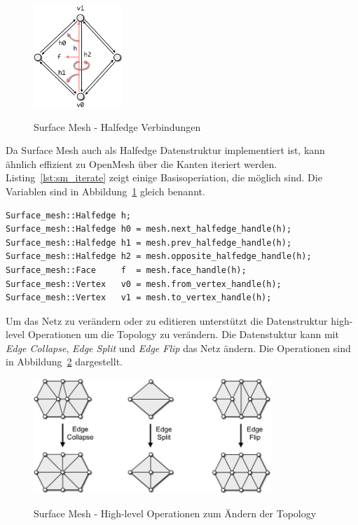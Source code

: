 \begin{figure}[h]
  \caption{Surface Mesh - Halfedge Verbindungen}
  \centering
  \includegraphics[width=0.3\textwidth]{content/media/sm_connectivity-queries}
  \label{fig:sm_halfedge}
\end{figure}

Da Surface Mesh auch als Halfedge Datenstruktur implementiert ist, kann ähnlich effizient zu OpenMesh über die Kanten iteriert werden.
Listing~\ref{lst:sm_iterate} zeigt einige Basisoperiation, die möglich sind.
Die Variablen sind in Abbildung~\ref{fig:sm_halfedge} gleich benannt. \cite{OpenGP.24.07.2015}

\begin{lstlisting}[style=myCppStyle, caption=Surface Mesh - Iterieren über Kanten einer Fläche, label=lst:sm_iterate]
Surface_mesh::Halfedge h;
Surface_mesh::Halfedge h0 = mesh.next_halfedge_handle(h);
Surface_mesh::Halfedge h1 = mesh.prev_halfedge_handle(h);
Surface_mesh::Halfedge h2 = mesh.opposite_halfedge_handle(h);
Surface_mesh::Face     f  = mesh.face_handle(h);
Surface_mesh::Vertex   v0 = mesh.from_vertex_handle(h);
Surface_mesh::Vertex   v1 = mesh.to_vertex_handle(h);
\end{lstlisting}

Um das Netz zu verändern oder zu editieren unterstützt die Datenstruktur high-level Operationen um die Topology zu verändern.
Die Datenstuktur kann mit \emph{Edge Collapse}, \emph{Edge Split} und \emph{Edge Flip} das Netz ändern.
Die Operationen sind in Abbildung~\ref{fig:sm_topology} dargestellt. \cite{OpenGP.24.07.2015}

\begin{figure}[h]
  \caption{Surface Mesh - High-level Operationen zum Ändern der Topology}
  \centering
  \includegraphics[width=0.8\textwidth]{content/media/sm_topology-changes}
  \label{fig:sm_topology}
\end{figure}

